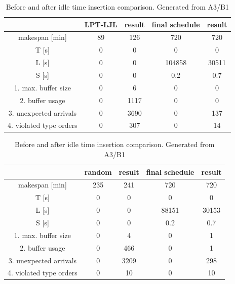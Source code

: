 \documentclass{ctuthesis}
\begin{document}
\begin{table}[H]
\begin{tabular}{ |c|| c | c | c | c |} 
\hline
 & LPT-LJL & result & final schedule & result \\ 
\hline
makespan [min] & 89 & 126 & 720 & 720 \\
\hline
T [s]& 0 & 0 & 0 & 0 \\
\hline
L [s]& 0 & 0 & 104858 & 30511 \\
\hline
S [s]& 0 & 0 & 0.2 & 0.7 \\
\hline
1. max. buffer size & 0 & 6 & 0 & 0\\ 
\hline
2. buffer usage  & 0 & 1117 & 0 & 0\\ 
\hline
3. unexpected arrivals & 0 & 3690 & 0 & 137\\ 
\hline
4. violated type orders & 0 & 307 & 0 & 14\\ 
\hline
\end{tabular}
\caption{Before and after idle time insertion comparison. Generated from A3/B1}
\end{table}

\begin{table}[H]
\begin{tabular}{ |c|| c | c | c | c |} 
\hline
 & random & result & final schedule & result \\ 
\hline
makespan [min] & 235 & 241 & 720 & 720 \\
\hline
T [s]& 0 & 0 & 0 & 0 \\
\hline
L [s]& 0 & 0 & 88151 & 30153 \\
\hline
S [s]& 0 & 0 & 0.2 & 0.7 \\
\hline
1. max. buffer size & 0 & 4 & 0 & 1\\ 
\hline
2. buffer usage  & 0 & 466 & 0 & 1\\ 
\hline
3. unexpected arrivals & 0 & 3209 & 0 & 298\\ 
\hline
4. violated type orders & 0 & 10 & 0 & 10\\ 
\hline
\end{tabular}
\caption{Before and after idle time insertion comparison. Generated from A3/B1}
\end{table}
\end{document}
